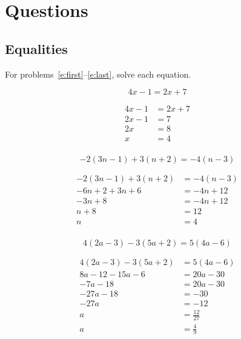 \documentclass[letterpaper, landscape]{exam}
\begin{document}
  \section{Questions}

  \subsection{Equalities}

  For problems~\ref{e:first}--\ref{e:last}, solve each equation.

  \begin{questions}

    \question[5]\label{e:first}
      \[ 
        4x - 1 = 2x + 7 
      \]
      \begin{solution}
        \begin{align*}
          4x - 1 & = 2x + 7 \\
          2x - 1 & = 7 \\
          2x     & = 8 \\
          x      & = 4 \\
        \end{align*}
      \end{solution}

    \question[5]\label{e:first}
      \[ 
        -2(3n - 1) + 3(n + 2) = -4(n - 3) 
      \]
      \begin{solution}
        \begin{align*}
          -2(3n - 1) + 3(n + 2) & = -4(n - 3) \\
          -6n + 2 + 3n + 6      & = -4n + 12  \\
          -3n + 8               & = -4n + 12  \\
          n + 8                 & = 12  \\
          n                     & = 4  \\
        \end{align*}
      \end{solution}

    \question[5]\label{e:first}
      \[ 
        4(2a - 3) - 3(5a + 2) = 5(4a - 6) 
      \]

      \begin{solution}
        \begin{align*}
          4(2a - 3) - 3(5a + 2) & = 5(4a - 6) \\
          8a - 12 - 15a - 6     & = 20a - 30 \\
          -7a - 18              & = 20a - 30 \\
          -27a - 18             & = -30 \\
          -27a                  & = -12 \\
          a                     & = \frac{12}{27} \\
          a                     & = \frac{4}{9} \\
        \end{align*}
      \end{solution}


\end{questions}
\end{document}
